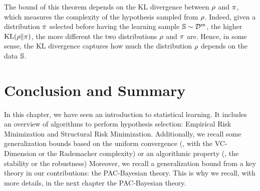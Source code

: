 The bound of this theorem depends on the KL divergence between $\Q$ and $\P$, which measures the complexity of the hypothesis sampled from $\Q$.
Indeed, given a distribution $\P$ selected \apriori before having the learning sample $\S\sim\D^\m$, the higher $\KL(\Q\|\P)$, the more different the two distributions $\Q$ and $\P$ are.
Hence, in some sense, the KL divergence captures how much the distribution $\Q$ depends on the data $\S$.

\section{Conclusion and Summary}

In this chapter, we have seen an introduction to statistical learning.
It includes an overview of algorithms to perform hypothesis selection: Empirical Risk Minimization and Structural Risk Minimization.
Additionally, we recall some generalization bounds based on the uniform convergence (\eg, with the VC-Dimension or the Rademacher complexity) or an algorithmic property (\eg, the stability or the robustness)
Moreover, we recall a generalization bound from a key theory in our contributions: the PAC-Bayesian theory.
This is why we recall, with more details, in the next chapter the PAC-Bayesian theory.